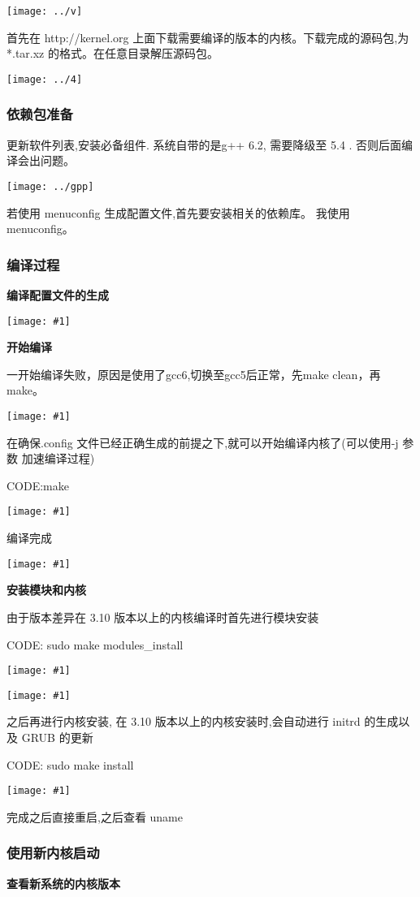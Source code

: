 \documentclass{article}
\newcommand{\incpng}[1]{\texttt{[image: \#1]}}
\begin{document}
\begin{CJK}{UTF8}{gkai}
\texttt{[image: ../v]}

首先在 http://kernel.org 上面下载需要编译的版本的内核。下载完成的源码包,为*.tar.xz 的格式。在任意目录解压源码包。

\texttt{[image: ../4]}

\subsubsection{依赖包准备}
更新软件列表,安装必备组件. 系统自带的是g++ 6.2, 需要降级至 5.4 . 否则后面编译会出问题。

\texttt{[image: ../gpp]}

若使用 menuconfig 生成配置文件,首先要安装相关的依赖库。 我使用menuconfig。

\subsubsection{编译过程}
\textbf{编译配置文件的生成}

\incpng{../menu}

\textbf{开始编译}

一开始编译失败，原因是使用了gcc6,切换至gcc5后正常，先make clean，再make。

\incpng{../clean}

在确保.config 文件已经正确生成的前提之下,就可以开始编译内核了(可以使用-j 参数
加速编译过程)

CODE:make

\incpng{../make}

编译完成

\incpng{../finish}

\textbf{安装模块和内核}

由于版本差异在 3.10 版本以上的内核编译时首先进行模块安装

CODE: sudo make modules\_install

\incpng{../modules}

\incpng{../modfi}

之后再进行内核安装, 在 3.10 版本以上的内核安装时,会自动进行 initrd 的生成以及 GRUB
的更新

CODE: sudo make install

\incpng{../install}


完成之后直接重启,之后查看 uname

\subsubsection{使用新内核启动}
\textbf{查看新系统的内核版本}


\end{CJK}
\end{document}
